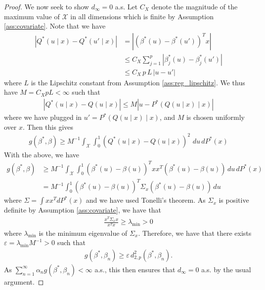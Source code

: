 \documentclass[11pt,a4paper]{article}
\begin{document}
\begin{appendices}
\begin{proof}
We now seek to show $d_\infty = 0$ a.s.
Let $C_X$ denote the magnitude of the maximum value of $\mathcal{X}$ in all dimensions which is finite by {{Assumption \ref{ass:covariate}}}. Note that we have
\begin{align*}
    \left|Q^*(u \mid x) - Q^*(u' \mid x)\right|  &= \left|\left(\beta^*(u) - \beta^{*}(u')\right)^T x\right| \\
    &\leq C_X\sum_{j = 1}^p \left|\beta^*_j(u) - \beta^*_j(u')\right|\\
    &\leq C_X\, p\,L \, |u - u'|
\end{align*}
where $L$ is the Lipschitz constant from {Assumption \ref{ass:reg_lipschitz}}.
We thus have $M= C_XpL<\infty$ such that
\begin{align*}
   |Q^*(u \mid x) - Q(u \mid x)| \leq   M \left|u - P^*\left(Q(u \mid x) \mid x\right)\right|
\end{align*}
where we have plugged in $u' = P^*\left(Q(u \mid x)\mid x\right)$, and $M$ is chosen uniformly over $x$. Then this gives
\begin{align*}
    g(\beta^*,\beta) \geq M^{-1}\int_{\mathcal{X}}\int_0^1  \left(Q^*(u \mid x) - Q(u \mid x)\right)^2 \, \, du \, dP^*(x)
\end{align*}
With the above, we have
\begin{align*}
g(\beta^*,\beta) 
    &\geq M^{-1}\int_{\mathcal{X}} \int_0^1\left(\beta^*(u) - \beta(u)\right)^Tx x^T\left(\beta^*(u) - \beta(u)\right) \,du \,  dP^*(x)\\
    &= M^{-1}\int_0^1 \left(\beta^*(u) - \beta(u)\right)^T\Sigma_x\left(\beta^*(u) - \beta(u)\right) \, du
\end{align*}
where $\Sigma = \int x x^T dP^*(x)$ and we have used Tonelli's theorem.
As $\Sigma_x$ is positive definite by {Assumption \ref{ass:covariate}}, we have that 
\begin{align*}
    \frac{x^T \Sigma_x x}{x^Tx} \geq \lambda_{\text{min}} > 0
\end{align*}
where $\lambda_{\text{min}}$ is the minimum eigenvalue of $\Sigma_x$. Therefore, we have that there exists $\varepsilon = \lambda_{\text{min}}M^{-1} >0$ such that
\begin{align*}
    g(\beta^*,\beta_n) \geq \varepsilon \,  d^2_{2,p}\left(\beta^*,\beta_{n}\right).
\end{align*}
As $\sum_{n = 1}^\infty \alpha_n g(\beta^*, \beta_n) < \infty$ a.s., this then ensures that $d_\infty = 0$ a.s. by the usual argument.
\end{proof}


\end{appendices}
\end{document}
